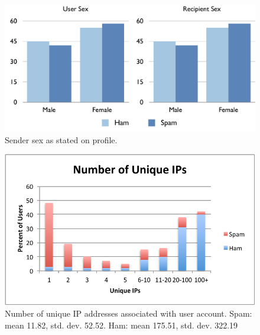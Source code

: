 \documentclass[preprint]{acm_proc_article-sp}
\begin{document}
\begin{figure}[h]
    \centering
    \includegraphics[width=\linewidth]{figures/sex.pdf}
    \caption{Sender sex as stated on profile.}
    \label{fig:sendsex}
\end{figure}

\begin{figure}[h]
    \centering
    \includegraphics[width=\linewidth]{figures/unique-ips.pdf}
    \caption{Number of unique IP addresses associated with user account. Spam: mean 11.82, std. dev. 52.52. Ham: mean 175.51, std. dev. 322.19}
    \label{fig:uniqip}
\end{figure}











\balancecolumns
\end{document}
